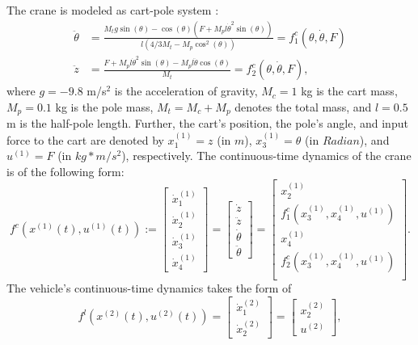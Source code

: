 The crane is modeled as cart-pole system \cite{Barto1983}:
\begin{align*}
	\ddot{\theta} &= \frac{M_tg\sin(\theta) - \cos(\theta)(F + M_pl \dot{\theta}^2 \sin(\theta))}{l(4/3 M_t- M_p \cos^2(\theta))}=f^c_1(\theta,\dot{\theta},F)\\
	\ddot{z}&= \frac{F + M_pl \dot{\theta}^2 \sin(\theta)-M_pl \ddot{\theta} \cos(\theta)}{M_t}=f^c_2(\theta,\dot{\theta},F),
\end{align*}
where
	$g=-9.8$ m/s$^2$ is the acceleration of gravity,
	$M_c=1$ kg is the cart mass,
	$M_p=0.1$ kg is the pole mass,
	$M_t=M_c+M_p$ denotes the total mass,
and
	$l=0.5$ m is the half-pole length.
Further, the cart's position, the pole's angle, and input force to the cart are denoted by $x_1^{(1)}=z$ (in $m$), $x_3^{(1)}=\theta$ (in $Radian$), 
and $u^{(1)}=F$ (in $kg *m/s^2$), respectively. 
The continuous-time dynamics of the crane is of the following form:
\[f^{c}(x^{(1)}(t),u^{(1)}(t)):=\begin{bmatrix}
	\dot{x}_1^{(1)}\\
	\dot{x}_2^{(1)}\\
	\dot{x}_3^{(1)}\\
	\dot{x}_4^{(1)}
\end{bmatrix}=\begin{bmatrix}
\dot{z}\\
\ddot{z}\\
\dot{\theta}\\
\ddot{\theta}
\end{bmatrix}=
\begin{bmatrix}
	x_2^{(1)}\\
	f^c_1(x_3^{(1)},x_4^{(1)},u^{(1)})\\
	x_4^{(1)}\\
	f^c_2(x_3^{(1)},x_4^{(1)},u^{(1)})\\
\end{bmatrix}.\]
The vehicle's continuous-time dynamics takes the form of
\[f^{l}(x^{(2)}(t),u^{(2)}(t))=\begin{bmatrix}
\dot{x}_1^{(2)}\\ \dot{x}^{(2)}_2 \end{bmatrix}=\begin{bmatrix} x^{(2)}_2\\ u^{(2)} \end{bmatrix},
\]
